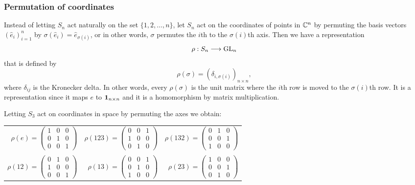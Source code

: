 \subsubsection{Permutation of coordinates}

Instead of letting $S_n$ act naturally on the set $\{1, 2, \dots, n\}$, let $S_n$ act on the coordinates of points in $\mathbb{C}^n$ by permuting the basis vectors $(\hat{e}_i)_{i=1}^n$ by $\sigma(\hat{e}_i) = \hat{e}_{\sigma(i)}$, or in other words, $\sigma$ permutes the $i$th to the $\sigma(i)$th axis. Then we have a representation
\[
\rho: S_n \longrightarrow \text{GL}_n
\]
that is defined by 
\[
\rho(\sigma) = \left(\delta_{i, \sigma(i)}\right)_{n \times n},
\]
where $\delta_{ij}$ is the Kronecker delta. In other words, every $\rho(\sigma)$ is the unit matrix where the $i$th row is moved to the $\sigma(i)$th row. It is a representation since it maps $e$ to $\mathbf{1}_{n  \times n}$ and it is a homomorphism by matrix multiplication.

\begin{example}
	Letting $S_3$ act on coordinates in space by permuting the axes we obtain:
	\begin{table}[hbt!]
		\centering
		\begin{tabular}{r r r}
			$\rho(e) = 
			\begin{pmatrix}
				1 & 0 & 0 \\
				0 & 1 & 0 \\
				0 & 0 & 1
			\end{pmatrix}$ & 
			$\rho(123) = 
			\begin{pmatrix}
				0 & 0 & 1 \\
				1 & 0 & 0 \\
				0 & 1 & 0
			\end{pmatrix}$ & 
			$\rho(132) = 
			\begin{pmatrix}
				0 & 1 & 0 \\
				0 & 0 & 1 \\
				1 & 0 & 0
			\end{pmatrix}$ \\ & & \\
			$\rho(12) = 
			\begin{pmatrix}
				0 & 1 & 0 \\
				1 & 0 & 0 \\
				0 & 0 & 1
			\end{pmatrix}$ &
			$\rho(13) = 
			\begin{pmatrix}
				0 & 0 & 1 \\
				0 & 1 & 0 \\
				1 & 0 & 0
			\end{pmatrix}$ &
			$\rho(23) = 
			\begin{pmatrix}
				1 & 0 & 0 \\
				0 & 0 & 1 \\
				0 & 1 & 0
			\end{pmatrix}$
		\end{tabular}
	\end{table}
\end{example}


